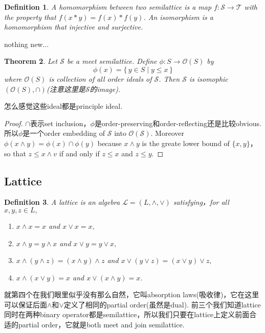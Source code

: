 \documentclass{article}
\newtheorem{theorem}{Theorem}[section]
\newtheorem{definition}[theorem]{Definition}
\newcommand*{\xfunc}[4]{{#2}\colon{#3}{#1}{#4}}
\newcommand*{\func}[3]{\xfunc{\to}{#1}{#2}{#3}}
\newcommand\Set[2]{\{\,#1\mid#2\,\}} %
\newcommand\slattice{\mathcal{S}}
\newcommand\lattice{\mathcal{L}}
\begin{document}
\begin{definition}\rm A {\color{red} homomorphism} between two semilattice is a map $\func{f}{\slattice}{\mathcal{T}}$ with the property that $f(x*y) = f(x) * f(y)$. An {\color{red} isomorphism} is a homomorphism that injective and surjective.
\end{definition}

{\color{blue} nothing new}...

\begin{theorem}
\rm Let $\slattice$ be a meet semilattice. Define $\func{\phi}{S}{\mathcal{O}(S)}$ by
$$
\phi(x) = \Set{y \in S}{y \leq x}
$$
where $\mathcal{O}(S)$ is collection of all order ideals of $\slattice$. Then $\slattice$ is isomophic $(\mathcal{O}(S),\cap)$(注意这里是$\slattice$的image).
\end{theorem}

{\color{blue} 怎么感觉这些ideal都是principle ideal}.

\begin{proof}
$\cap$表示set inclusion，$\phi$是order-preserving和order-reflecting还是比较obvious. 所以$\phi$是一个order embedding of $\slattice$ into $\mathcal{O}(\slattice)$. Moreover $\phi(x \wedge y) = \phi(x) \cap \phi(y)$ because $x \wedge y$ is the greate lower bound of $\{x,y\}$，so that $z \leq x \wedge v$ if and only if $z \leq x$ and $z \leq y$. 
\end{proof}


\newpage
\subsection{Lattice}
\begin{definition}
\rm A {\color{red} lattice} is an algebra $\lattice = (L,\wedge,\vee)$ satisfying，for all $x,y,z \in L,$
\begin{enumerate}
	\item $x \wedge x = x$ and $x \vee x = x,$
	\item $x \wedge y = y \wedge x$ and $x \vee y = y \vee x,$
	\item $x \wedge (y \wedge z) = (x \wedge y) \wedge z$ and $x \vee (y \vee z) = (x \vee y) \vee z,$
	\item $x \wedge (x \vee y) = x$ and $x \vee (x \wedge y) = x.$ 
\end{enumerate}
\end{definition}

{\color{blue} 就第四个在我们眼里似乎没有那么自然，它叫absorption laws(吸收律)，它在这里可以保证后面$\wedge$和$\vee$定义了相同的partial order(虽然是dual). 前三个我们知道lattice同时在两种binary operator都是semilattice，所以我们只要在lattice上定义前面合适的partial order，它就是both meet and join semilattice}. 
\end{document}
